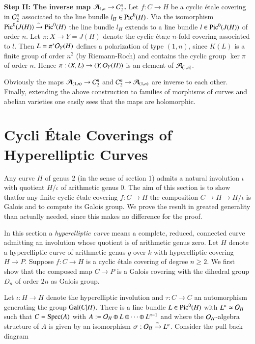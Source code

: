 \medskip
\noindent
{\bfseries Step II: The inverse map $\mathcal{A}_{1,n}\rightarrow \mathcal{C}_{2}^{n}$.} 
Let $f: C\rightarrow H$ be a cyclic \'etale covering in $\mathcal{C}_{2}^{n}$ associated to the line bundle $l_{H} \in \operatorname{Pic}^{0}(H)$. Via the isomorphism $\operatorname{Pic}^{0}(J(H)) \xrightarrow{\sim} \operatorname{Pic}^{0}(H)$ the line bundle $l_{H}$ extends to a line bundle $l \in \operatorname{Pic}^{0}(J(H))$ of order $n$. Let $\pi : X \rightarrow Y = J(H)$ denote the cyclic \'eta;e $n$-fold covering associated to $l$. Then $L=\pi^{*}\mathcal{O}_{Y}(H)$ defines a polarization of type $(1,n)$, since $K(L)$ is a finite group of order $n^{2}$ (by Riemann-Roch) and contains the cyclic group $\ker \pi$ of order $n$. Hence $\pi : (X, L) \rightarrow (Y, \mathcal{O}_{Y}(H))$ is an element of $\mathcal{A}_{(1,n)}$.

Obviously the maps $\mathcal{A}_{(1,n)}\rightarrow \mathcal{C}_{2}^{n}$ and $\mathcal{C}_{2}^{n} \rightarrow \mathcal{A}_{(1,n)}$ are inverse to each other. Finally, extending the above construction to families of morphisms of curves and abelian varieties one easily sees that the maps are holomorphic.

\section{Cycli \'Etale Coverings of Hyperelliptic Curves}\label{chap11-sec-2}

Any curve $H$ of genus 2 (in the sense of section 1) admits a natural involution $\iota$ with quotient $H/\iota$ of arithmetic genus 0. The aim of this section is to show that\pageoriginale for any finite cyclic \'etale covering $f: C\rightarrow H$ the composition $C\rightarrow H\rightarrow H/\iota$ is Galois and to compute its Galois group. We prove the result in greated generality than actually needed, since this makes no difference for the proof.

In this section a \textit{hyperelliptic curve} means a complete, reduced, connected curve admitting an involution whose quotient is of arithmetic genus zero. Let $H$ denote a hyperelliptic curve of arithmetic genus $g$ over $k$ with hyperelliptic covering $H\rightarrow P$. Suppose $f : C\rightarrow H$ is a cyclic \'etale covering of degree $n \geq 2$. We first show that the composed map $C\rightarrow P$ is a Galois covering with the dihedral group $D_{n}$ of order $2n$ as Galois group.

Let $\iota : H \rightarrow H$ denote the hyperelliptic involution and $\tau : C\rightarrow C$ an automorphism generating the group $\operatorname{Gal}(C | H)$. There is a line bundle $L \in \operatorname{Pic}^{0}(H)$ with $L^{n}\simeq \mathcal{O}_{H}$ such that $C = \operatorname{Spec}(A)$ with $A : =\mathcal{O}_{H} \oplus L \oplus \cdots \oplus L^{n-1}$ and where the $\mathcal{O}_{H}$-algebra structure of $A$ is given by an isomorphism $\sigma : \mathcal{O}_{H} \xrightarrow{\sim}L^{n}$. Consider the pull back diagram

